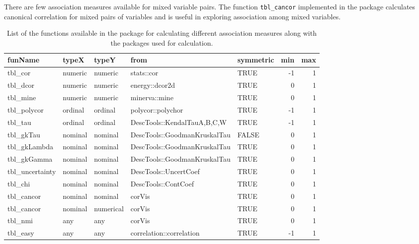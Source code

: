 There are few association measures available for mixed variable pairs.
The function \texttt{tbl\_cancor} implemented in the package calculates
canonical correlation for mixed pairs of variables and is useful in
exploring association among mixed variables.

\begin{Schunk}
\begin{table}

\caption{\label{tab:association-measures}List of the functions available in the package for calculating different association measures along with the packages used for calculation.}
\centering
\begin{tabular}[t]{lllllrr}
\toprule
funName & typeX & typeY & from & symmetric & min & max\\
\midrule
tbl\_cor & numeric & numeric & stats::cor & TRUE & -1 & 1\\
tbl\_dcor & numeric & numeric & energy::dcor2d & TRUE & 0 & 1\\
tbl\_mine & numeric & numeric & minerva::mine & TRUE & 0 & 1\\
tbl\_polycor & ordinal & ordinal & polycor::polychor & TRUE & -1 & 1\\
tbl\_tau & ordinal & ordinal & DescTools::KendalTauA,B,C,W & TRUE & -1 & 1\\
\addlinespace
tbl\_gkTau & nominal & nominal & DescTools::GoodmanKruskalTau & FALSE & 0 & 1\\
tbl\_gkLambda & nominal & nominal & DescTools::GoodmanKruskalTau & TRUE & 0 & 1\\
tbl\_gkGamma & nominal & nominal & DescTools::GoodmanKruskalTau & TRUE & 0 & 1\\
tbl\_uncertainty & nominal & nominal & DescTools::UncertCoef & TRUE & 0 & 1\\
tbl\_chi & nominal & nominal & DescTools::ContCoef & TRUE & 0 & 1\\
\addlinespace
tbl\_cancor & nominal & nominal & corVis & TRUE & 0 & 1\\
tbl\_cancor & nominal & numerical & corVis & TRUE & 0 & 1\\
tbl\_nmi & any & any & corVis & TRUE & 0 & 1\\
tbl\_easy & any & any & correlation::correlation & TRUE & -1 & 1\\
\bottomrule
\end{tabular}
\end{table}

\end{Schunk}

